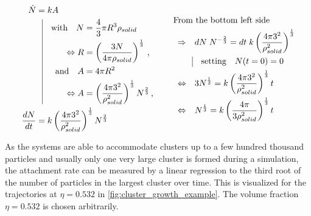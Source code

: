 \begin{align}
\label{eqn:constant_growth}  
\begin{split}
\dot{N} &= k A \\
          & \; \; \, \vrule
  \begin{aligned}[t]
    \quad \text{with}  \quad  N &= \frac{4}{3} \pi R^3 \rho_{solid}\\
    \Leftrightarrow R &= \left( \frac{3 N }{4 \pi \rho_{solid} }\right)^{\frac{1}{3}} \, \text{,} \\
    \quad \text{and}   \quad A &= 4 \pi R^2 \\
    \Leftrightarrow A &= \left(\frac{4 \pi 3^2 }{\rho_{solid}^2} \right)^\frac{1}{3} N^\frac{2}{3} \, \text{,}\\
  \end{aligned}\\
\frac{dN}{dt} &= k \left(\frac{4 \pi 3^2 }{\rho_{solid}^2} \right)^\frac{1}{3}  N^\frac{2}{3}\\
\end{split}
\hspace{1cm}
\begin{split}
& \!\!\!\!\!\!\!\!\! \text{From the bottom left side}\\
\Rightarrow& \quad dN \; N^{-\frac{2}{3}} = dt \; k \left(\frac{4 \pi 3^2 }{\rho_{solid}^2} \right)^\frac{1}{3}\\
          & \; \; \, \vrule
  \begin{aligned}[t]
    \quad \text{setting}  \quad  N(t=0) = 0\\
  \end{aligned}\\
\Leftrightarrow& \quad 3 N^{\frac{1}{3}} = k \left(\frac{4 \pi 3^2 }{\rho_{solid}^2} \right)^\frac{1}{3} t\\
\Leftrightarrow&  \quad N^{\frac{1}{3}} = k \left( \frac{4 \pi}{3 \rho_{solid}^2} \right)^\frac{1}{3} t
\end{split}
\end{align}  

As the systems are able to accommodate clusters up to a few hundred thousand particles and usually only one very large cluster is formed during a simulation, the attachment rate can be measured by a linear regression to the third root of the number of particles in the largest cluster over time. This is visualized for the trajectories at $\eta=0.532$ in \autoref{fig:cluster_growth_example}. The volume fraction $\eta=0.532$ is chosen arbitrarily.


